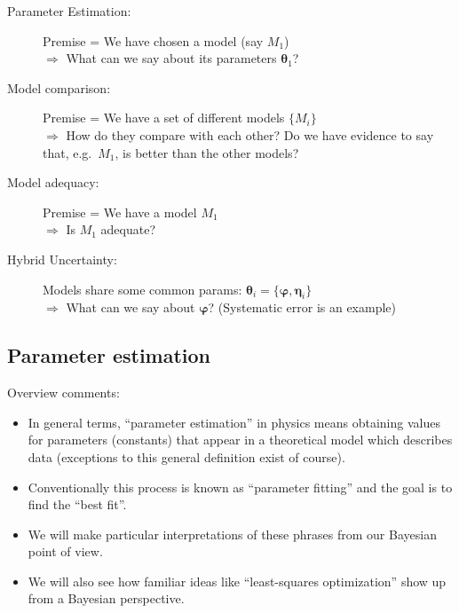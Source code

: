 \documentclass[%
oneside,                 %
final,                   %
10pt]{article}
\newenvironment{block_mdfboxadmon}[1][]{
\begin{block_mdfboxmdframed}[frametitle=#1]
}
{
\end{block_mdfboxmdframed}
}
\begin{document}

\begin{block_mdfboxadmon}[]
\begin{description}
\item[Parameter Estimation:] 
  Premise = We have chosen a model (say $M_1$)\\
  $\Rightarrow$ What can we say about its parameters $\boldsymbol{\theta}_1$?

\item[Model comparison:] 
  Premise = We have a set of different models $\{M_i\}$\\
  $\Rightarrow$ How do they compare with each other? Do we have evidence to say that, e.g.~$M_1$, is better than the other models?

\item[Model adequacy:] 
  Premise = We have a model $M_1$\\
  $\Rightarrow$ Is $M_1$ adequate?

\item[Hybrid Uncertainty:] 
  Models share some common params: $\boldsymbol{\theta}_i = \{ \boldsymbol{\varphi}, \boldsymbol{\eta}_i\}$\\
  $\Rightarrow$ What can we say about $\boldsymbol{\varphi}$? (Systematic error is an example)
\end{description}

\noindent
\end{block_mdfboxadmon} %



\subsection{Parameter estimation}

\begin{block_mdfboxadmon}[]
Overview comments:
\begin{itemize}
\item In general terms, ``parameter estimation'' in physics means obtaining values for parameters (constants) that appear in a theoretical model which describes data (exceptions to this general definition exist of course).

\item Conventionally this process is known as ``parameter fitting'' and the goal is to find the ``best fit''.

\item We will make particular interpretations of these phrases from our Bayesian point of view.

\item We will also see how familiar ideas like ``least-squares optimization'' show up from a Bayesian perspective.
\end{itemize}

\noindent
\end{block_mdfboxadmon} %
\end{document}
